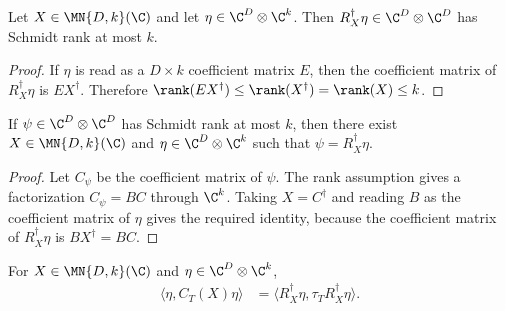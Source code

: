 \begin{lemma}
    \label{lem:right_tensor_adjoint_schmidt_rank}
    \leanok
    Let $X\in\MN{D,k}(\C)$ and let $\eta\in\C^D\otimes\C^k$. Then
    $R_X^\dagger\eta\in\C^D\otimes\C^D$ has Schmidt rank at most $k$.
\end{lemma}

\begin{proof}
    \leanok
    If $\eta$ is read as a $D\times k$ coefficient matrix $E$, then the
    coefficient matrix of $R_X^\dagger\eta$ is $EX^\dagger$. Therefore
    $\rank(EX^\dagger)\le\rank(X^\dagger)=\rank(X)\le k$.
\end{proof}

\begin{lemma}
    \label{lem:right_tensor_adjoint_schmidt_rank_representatives}
    \leanok
    If $\psi\in\C^D\otimes\C^D$ has Schmidt rank at most $k$, then there
    exist $X\in\MN{D,k}(\C)$ and $\eta\in\C^D\otimes\C^k$ such that
    $\psi=R_X^\dagger\eta$.
\end{lemma}

\begin{proof}
    \leanok
    Let $C_\psi$ be the coefficient matrix of $\psi$. The rank assumption
    gives a factorization $C_\psi=BC$ through $\C^k$. Taking
    $X=C^\dagger$ and reading $B$ as the coefficient matrix of $\eta$ gives
    the required identity, because the coefficient matrix of
    $R_X^\dagger\eta$ is $BX^\dagger=BC$.
\end{proof}

\begin{theorem}
    \label{thm:choi_right_compression_quadratic_form}
    \leanok
    For $X\in\MN{D,k}(\C)$ and $\eta\in\C^D\otimes\C^k$,
    \begin{align}
        \langle\eta,C_T(X)\eta\rangle
         & =\langle R_X^\dagger\eta,\tau_T R_X^\dagger\eta\rangle.
        \label{eq:schwarz_right_compression_quadratic}
    \end{align}
\end{theorem}

